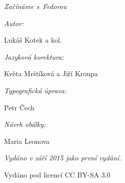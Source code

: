 \begin{center}

{\it\large Začínáme s~Fedorou}

\bigskip

{\it Autor:}

Lukáš Kotek a kol.

{\it Jazyková korektura:}

Květa Mrštíková a Jiří Kroupa

{\it Typografická úprava:}

Petr Čech

{\it Návrh obálky:}

Maria Leonova

{\it Vydáno v září 2015 jako první vydání.

Vydáno pod licencí CC BY-SA 3.0}
\end{center}
